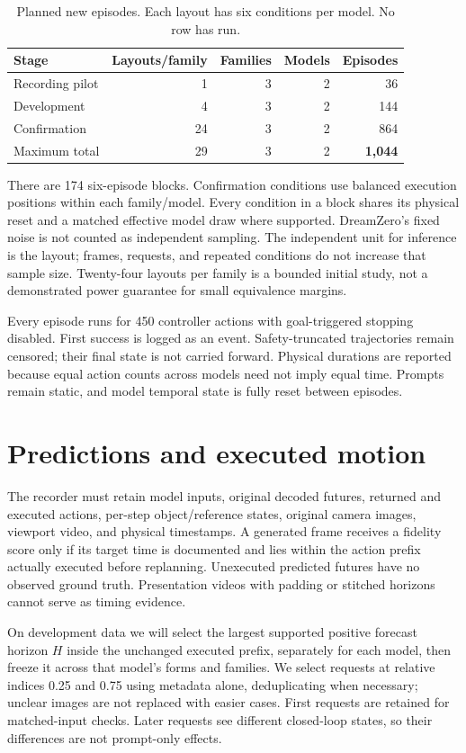 \documentclass[11pt]{article}
\begin{document}
\begin{table}[ht]
\centering
\caption{Planned new episodes. Each layout has six conditions per model. No row has run.}
\label{tab:matrix}
\begin{tabular}{@{}lrrrr@{}}
\toprule
Stage & Layouts/family & Families & Models & Episodes \\
\midrule
Recording pilot & 1 & 3 & 2 & 36 \\
Development & 4 & 3 & 2 & 144 \\
Confirmation & 24 & 3 & 2 & 864 \\
\midrule
Maximum total & 29 & 3 & 2 & \textbf{1,044} \\
\bottomrule
\end{tabular}
\end{table}

There are 174 six-episode blocks. Confirmation conditions use balanced execution positions within each family/model. Every condition in a block shares its physical reset and a matched effective model draw where supported. DreamZero's fixed noise is not counted as independent sampling. The independent unit for inference is the layout; frames, requests, and repeated conditions do not increase that sample size. Twenty-four layouts per family is a bounded initial study, not a demonstrated power guarantee for small equivalence margins.

Every episode runs for 450 controller actions with goal-triggered stopping disabled. First success is logged as an event. Safety-truncated trajectories remain censored; their final state is not carried forward. Physical durations are reported because equal action counts across models need not imply equal time. Prompts remain static, and model temporal state is fully reset between episodes.

\section{Predictions and executed motion}
The recorder must retain model inputs, original decoded futures, returned and executed actions, per-step object/reference states, original camera images, viewport video, and physical timestamps. A generated frame receives a fidelity score only if its target time is documented and lies within the action prefix actually executed before replanning. Unexecuted predicted futures have no observed ground truth. Presentation videos with padding or stitched horizons cannot serve as timing evidence.

On development data we will select the largest supported positive forecast horizon $H$ inside the unchanged executed prefix, separately for each model, then freeze it across that model's forms and families. We select requests at relative indices 0.25 and 0.75 using metadata alone, deduplicating when necessary; unclear images are not replaced with easier cases. First requests are retained for matched-input checks. Later requests see different closed-loop states, so their differences are not prompt-only effects.
\end{document}
